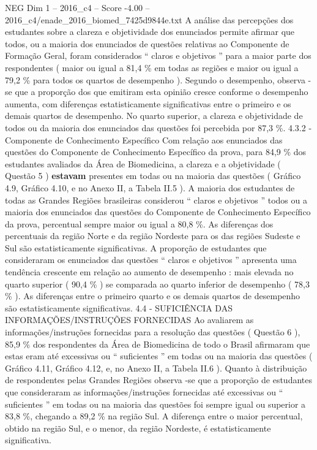 \begin{textsample}{NEG Dim 1 – 2016\_c4 – Score -4.00 – 2016\_c4/enade\_2016\_biomed\_7425d9844e.txt}
A análise das percepções dos estudantes sobre a clareza e objetividade dos enunciados permite afirmar que todos, ou a maioria dos enunciados de questões relativas ao Componente de Formação Geral, foram considerados “ claros e objetivos ” para a maior parte dos respondentes ( maior ou igual a 81,4 \% em todas as regiões e maior ou igual a 79,2 \% para todos os quartos de desempenho ).
Segundo o desempenho, observa -se que a proporção dos que emitiram esta opinião cresce conforme o desempenho aumenta, com diferenças estatisticamente significativas entre o primeiro e os demais quartos de desempenho.
No quarto superior, a clareza e objetividade de todos ou da maioria dos enunciados das questões foi percebida por 87,3 \%. 4.3.2 - Componente de Conhecimento Específico Com relação aos enunciados das questões do Componente de Conhecimento Específico da prova, para 84,9 \% dos estudantes avaliados da Área de Biomedicina, a clareza e a objetividade ( Questão 5 ) \textbf{estavam} presentes em todas ou na maioria das questões ( Gráfico 4.9, Gráfico 4.10, e no Anexo II, a Tabela II.5 ).
A maioria dos estudantes de todas as Grandes Regiões brasileiras considerou “ claros e objetivos ” todos ou a maioria dos enunciados das questões do Componente de Conhecimento Específico da prova, percentual sempre maior ou igual a 80,8 \%.
As diferenças dos percentuais da região Norte e da região Nordeste para os das regiões Sudeste e Sul são estatisticamente significativas.
A proporção de estudantes que consideraram os enunciados das questões “ claros e objetivos ” apresenta uma tendência crescente em relação ao aumento de desempenho : mais elevada no quarto superior ( 90,4 \% ) se comparada ao quarto inferior de desempenho ( 78,3 \% ).
As diferenças entre o primeiro quarto e os demais quartos de desempenho são estatisticamente significativas. 4.4 - SUFICIÊNCIA DAS INFORMAÇÕES/INSTRUÇÕES FORNECIDAS Ao avaliarem as informações/instruções fornecidas para a resolução das questões ( Questão 6 ), 85,9 \% dos respondentes da Área de Biomedicina de todo o Brasil afirmaram que estas eram até excessivas ou “ suficientes ” em todas ou na maioria das questões ( Gráfico 4.11, Gráfico 4.12, e, no Anexo II, a Tabela II.6 ).
Quanto à distribuição de respondentes pelas Grandes Regiões observa -se que a proporção de estudantes que consideraram as informações/instruções fornecidas até excessivas ou “ suficientes ” em todas ou na maioria das questões foi sempre igual ou superior a 83,8 \%, chegando a 89,2 \% na região Sul.
A diferença entre o maior percentual, obtido na região Sul, e o menor, da região Nordeste, é estatisticamente significativa.

\end{textsample}
